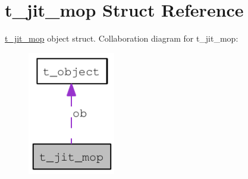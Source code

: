 \hypertarget{structt__jit__mop}{
\section{t\_\-jit\_\-mop Struct Reference}
\label{structt__jit__mop}
}


\hyperlink{structt__jit__mop}{t\_\-jit\_\-mop} object struct.  
Collaboration diagram for t\_\-jit\_\-mop:\nopagebreak
\begin{figure}[H]
\begin{center}
\leavevmode
\includegraphics[width=108pt]{structt__jit__mop__coll__graph}
\end{center}
\end{figure}
